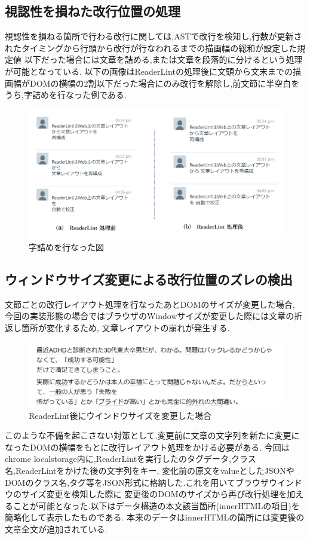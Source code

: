 \subsection{視認性を損ねた改行位置の処理}
視認性を損ねる箇所で行わる改行に関しては,ASTで改行を検知し,行数が更新されたタイミングから行頭から改行が行なわれるまでの描画幅の総和が設定した規定値
以下だった場合には文章を詰める,または文章を段落的に分けるという処理が可能となっている.
以下の画像はReaderLintの処理後に文頭から文末までの描画幅がDOMの横幅の2割以下だった場合にのみ改行を解除し,前文節に半空白をうち,字詰めを行なった例である.

\begin{figure}[H]
    \centering
    \label{fig:image16}
    \includegraphics[width=0.7\columnwidth]{image/03/img10.png}
	\caption[字詰めを行なった図]{字詰めを行なった図}
\end{figure}

\subsection{ウィンドウサイズ変更による改行位置のズレの検出}
文節ごとの改行レイアウト処理を行なったあとDOMのサイズが変更した場合,
今回の実装形態の場合ではブラウザのWindowサイズが変更した際には文章の折返し箇所が変化するため,
文章レイアウトの崩れが発生する.

\begin{figure}[H]
    \centering
    \label{fig:image16}
    \includegraphics[width=0.7\columnwidth]{image/03/img9.png}
	\caption[ReaderLint後にウインドウサイズを変更した場合]{ReaderLint後にウインドウサイズを変更した場合}
\end{figure}

このような不備を起こさない対策として.変更前に文章の文字列を新たに変更になったDOMの横幅をもとに改行レイアウト処理をかける必要がある.
今回はchrome localstorage内に,ReaderLintを実行したのタグデータ,クラス名,ReaderLintをかけた後の文字列をキー,
変化前の原文をvalueとしたJSONやDOMのクラス名,タグ等をJSON形式に格納した.これを用いてブラウザウインドウのサイズ変更を検知した際に
変更後のDOMのサイズから再び改行処理を加えることが可能となった.以下はデータ構造の本文該当箇所(innerHTMLの項目)を簡略化して表示したものである.
本来のデータはinnerHTMLの箇所には変更後の文章全文が追加されている.


